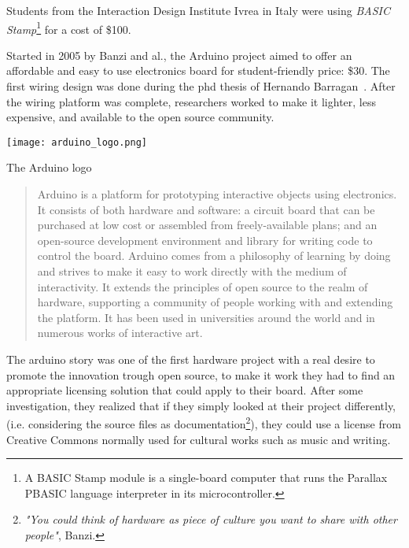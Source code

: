 Students from the Interaction Design Institute Ivrea in Italy were using \emph{BASIC Stamp}\footnote{A BASIC Stamp module is a single-board computer that runs the Parallax PBASIC language interpreter in its microcontroller.} for a cost of \$100.

\begin{row}{4}{2}
    \begin{cell}{3}
      Started in 2005 by Banzi and al., the Arduino project aimed to offer an affordable and easy to use electronics board for student-friendly price: \$30. The first wiring design was done during the phd thesis of Hernando Barragan~\cite{barragan2004wiring}. After the wiring platform was complete, researchers worked to make it lighter, less expensive, and available to the open source community.
    \end{cell}
    \begin{cell}{1}
        \begin{NFfigure}
            \centering
                \texttt{[image: arduino\_logo.png]}
            \caption{The Arduino logo}
            \label{fig:arduino_logo}
        \end{NFfigure}
    \end{cell}
\end{row}

\begin{quotation}
  Arduino is a platform for prototyping interactive objects using electronics. It consists of both hardware and software: a circuit board that can be purchased at low cost or assembled from freely-available plans; and an open-source development environment and library for writing code to control the board. Arduino comes from a philosophy of learning by doing and strives to make it easy to work directly with the medium of interactivity. It extends the principles of open source to the realm of hardware, supporting a community of people working with and extending the platform. It has been used in universities around the world and in numerous works of interactive art.

\end{quotation}

The arduino story was one of the first hardware project with a real desire to promote the innovation trough open source, to make it work they had to find an appropriate licensing solution that could apply to their board. After some investigation, they realized that if they simply looked at their project differently, (i.e. considering the source files as documentation\footnote{\emph{"You could think of hardware as piece of culture you want to share with other people"}, Banzi. }), they could use a license from Creative Commons normally used for cultural works such as music and writing.


